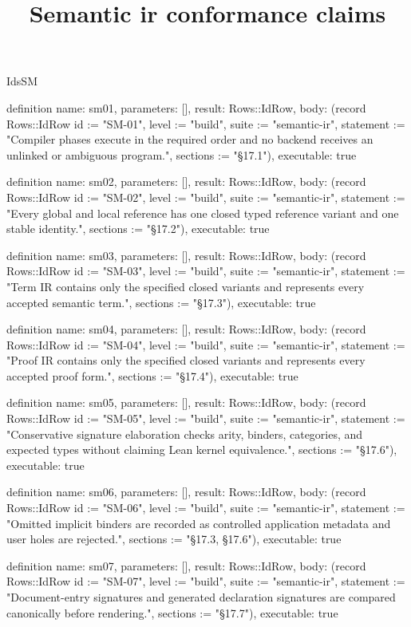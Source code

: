 \begin{lexlean}{IdsSM}
\title{Semantic ir conformance claims}
\begin{semanticmodule}
definition{
  name: sm01,
  parameters: [],
  result: Rows::IdRow,
  body: (record Rows::IdRow {id := "SM-01", level := "build", suite := "semantic-ir", statement := "Compiler phases execute in the required order and no backend receives an unlinked or ambiguous program.", sections := "§17.1"}),
  executable: true
}

definition{
  name: sm02,
  parameters: [],
  result: Rows::IdRow,
  body: (record Rows::IdRow {id := "SM-02", level := "build", suite := "semantic-ir", statement := "Every global and local reference has one closed typed reference variant and one stable identity.", sections := "§17.2"}),
  executable: true
}

definition{
  name: sm03,
  parameters: [],
  result: Rows::IdRow,
  body: (record Rows::IdRow {id := "SM-03", level := "build", suite := "semantic-ir", statement := "Term IR contains only the specified closed variants and represents every accepted semantic term.", sections := "§17.3"}),
  executable: true
}

definition{
  name: sm04,
  parameters: [],
  result: Rows::IdRow,
  body: (record Rows::IdRow {id := "SM-04", level := "build", suite := "semantic-ir", statement := "Proof IR contains only the specified closed variants and represents every accepted proof form.", sections := "§17.4"}),
  executable: true
}

definition{
  name: sm05,
  parameters: [],
  result: Rows::IdRow,
  body: (record Rows::IdRow {id := "SM-05", level := "build", suite := "semantic-ir", statement := "Conservative signature elaboration checks arity, binders, categories, and expected types without claiming Lean kernel equivalence.", sections := "§17.6"}),
  executable: true
}

definition{
  name: sm06,
  parameters: [],
  result: Rows::IdRow,
  body: (record Rows::IdRow {id := "SM-06", level := "build", suite := "semantic-ir", statement := "Omitted implicit binders are recorded as controlled application metadata and user holes are rejected.", sections := "§17.3, §17.6"}),
  executable: true
}

definition{
  name: sm07,
  parameters: [],
  result: Rows::IdRow,
  body: (record Rows::IdRow {id := "SM-07", level := "build", suite := "semantic-ir", statement := "Document-entry signatures and generated declaration signatures are compared canonically before rendering.", sections := "§17.7"}),
  executable: true
}


\end{semanticmodule}
\end{lexlean}
